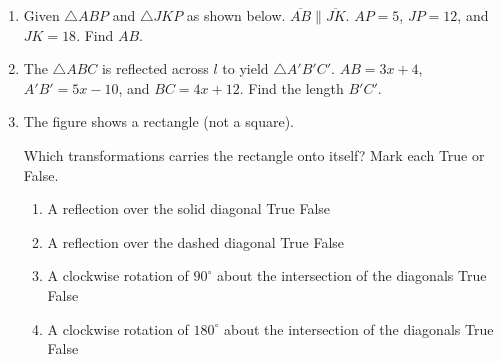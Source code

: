\documentclass[12pt, twoside]{article}
\begin{document}
\begin{enumerate}
\newpage

\item Given $\triangle ABP$ and $\triangle JKP$ as shown below. $\overline{AB} \parallel \overline{JK}$. $AP=5$, $JP=12$, and $JK=18$. Find $AB$.
\begin{center}
    \end{center}
\vspace{2cm}

\item The $\triangle ABC$ is reflected across $l$ to yield $\triangle A'B'C'$. $AB=3x+4$, $A'B'=5x-10$, and $BC=4x+12$. Find the length $B'C'$. %
  \begin{center}
\end{center} \vspace{2cm}

\newpage
\item The figure shows a rectangle (not a square).
  \begin{center}
  \end{center}
  Which transformations carries the rectangle onto itself? Mark each True or False.
    \begin{enumerate}
      \item A reflection over the solid diagonal \hfill True \quad False
      \item A reflection over the dashed diagonal \hfill True \quad False
      \item A clockwise rotation of $90^\circ$ about the intersection of the diagonals \hfill True \quad False
      \item A clockwise rotation of $180^\circ$ about the intersection of the diagonals \hfill True \quad False
    \end{enumerate}
    \vspace{1cm}


\end{enumerate}
\end{document}
